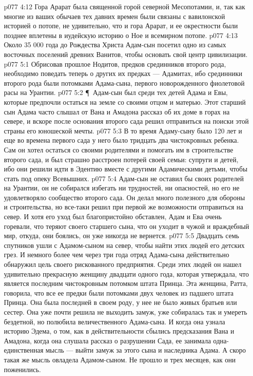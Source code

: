 \vs p077 4:12 Гора Арарат была священной горой северной Месопотамии, и, так как многие из ваших обычаев тех давних времен были связаны с вавилонской историей о потопе, не удивительно, что и гора Арарат, и ее окрестности были позднее вплетены в иудейскую историю о Ное и всемирном потопе.
\vs p077 4:13 Около 35 000 года до Рождества Христа Адам\hyp{}сын посетил одно из самых восточных поселений древних Ванитов, чтобы основать свой центр цивилизации.
\vs p077 5:1 Обрисовав прошлое Нодитов, предков срединников второго рода, необходимо поведать теперь о других их предках --- Адамитах, ибо срединники второго рода были потомками Адама\hyp{}сына, первого новорожденного фиолетовой расы на Урантии.
\vs p077 5:2 \P\ Адам\hyp{}сын был среди тех детей Адама и Евы, которые предпочли остаться на земле со своими отцом и матерью. Этот старший сын Адама часто слышал от Вана и Амадона рассказ об их доме в горах на севере, и вскоре после основания второго сада решил отправиться на поиски этой страны его юношеской мечты.
\vs p077 5:3 В то время Адаму\hyp{}сыну было 120 лет и еще во времена первого сада у него было тридцать два чистокровных ребенка. Сам он хотел остаться со своими родителями и помогать им в строительстве второго сада, и был страшно расстроен потерей своей семьи: супруги и детей, ибо они решили идти в Эдентию вместе с другими Адамическими детьми, чтобы стать под опеку Всевышних.
\vs p077 5:4 Адам\hyp{}сын не оставил бы своих родителей на Урантии, он не собирался избегать ни трудностей, ни опасностей, но его не удовлетворяло сообщество второго сада. Он делал много полезного для обороны и строительства, но все\hyp{}таки решил при первой же возможности отправиться на север. И хотя его уход был благопристойно обставлен, Адам и Ева очень горевали, что теряют своего старшего сына, что он уходит в чужой и враждебный мир, откуда, они боялись, он уже никогда не вернется.
\vs p077 5:5 Двадцать семь спутников ушли с Адамом\hyp{}сыном на север, чтобы найти этих людей его детских грез. И немного более чем через три года отряд Адама\hyp{}сына действительно обнаружил цель своего рискованного предприятия. Среди этих людей он нашел удивительно прекрасную женщину двадцати одного года, которая утверждала, что является последним чистокровным потомком штата Принца. Эта женщина, Ратта, говорила, что все ее предки были потомками двух человек из падшего штата Принца. Она была последней в своем роду, у нее не было живых братьев или сестер. Она уже почти решила не выходить замуж, уже собиралась так и умереть бездетной, но полюбила величественного Адама\hyp{}сына. И когда она узнала историю Эдема, о том, как в действительности сбылись предсказания Вана и Амадона, когда она слушала рассказ о разрушении Сада, ее занимала одна\hyp{}единственная мысль --- выйти замуж за этого сына и наследника Адама. А скоро такая же мысль овладела Адамом\hyp{}сыном. Не прошло и трех месяцев, как они поженились.
